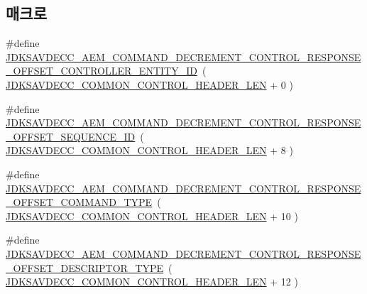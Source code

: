 \subsection*{매크로}
\begin{DoxyCompactItemize}
\item 
\#define \hyperlink{group__command__decrement__control__response_gafbe167331c37f417978a47a423589137}{J\+D\+K\+S\+A\+V\+D\+E\+C\+C\+\_\+\+A\+E\+M\+\_\+\+C\+O\+M\+M\+A\+N\+D\+\_\+\+D\+E\+C\+R\+E\+M\+E\+N\+T\+\_\+\+C\+O\+N\+T\+R\+O\+L\+\_\+\+R\+E\+S\+P\+O\+N\+S\+E\+\_\+\+O\+F\+F\+S\+E\+T\+\_\+\+C\+O\+N\+T\+R\+O\+L\+L\+E\+R\+\_\+\+E\+N\+T\+I\+T\+Y\+\_\+\+ID}~( \hyperlink{group__jdksavdecc__avtp__common__control__header_gaae84052886fb1bb42f3bc5f85b741dff}{J\+D\+K\+S\+A\+V\+D\+E\+C\+C\+\_\+\+C\+O\+M\+M\+O\+N\+\_\+\+C\+O\+N\+T\+R\+O\+L\+\_\+\+H\+E\+A\+D\+E\+R\+\_\+\+L\+EN} + 0 )
\item 
\#define \hyperlink{group__command__decrement__control__response_ga47aac604049ec4cf7d6ffb2fab3abbe1}{J\+D\+K\+S\+A\+V\+D\+E\+C\+C\+\_\+\+A\+E\+M\+\_\+\+C\+O\+M\+M\+A\+N\+D\+\_\+\+D\+E\+C\+R\+E\+M\+E\+N\+T\+\_\+\+C\+O\+N\+T\+R\+O\+L\+\_\+\+R\+E\+S\+P\+O\+N\+S\+E\+\_\+\+O\+F\+F\+S\+E\+T\+\_\+\+S\+E\+Q\+U\+E\+N\+C\+E\+\_\+\+ID}~( \hyperlink{group__jdksavdecc__avtp__common__control__header_gaae84052886fb1bb42f3bc5f85b741dff}{J\+D\+K\+S\+A\+V\+D\+E\+C\+C\+\_\+\+C\+O\+M\+M\+O\+N\+\_\+\+C\+O\+N\+T\+R\+O\+L\+\_\+\+H\+E\+A\+D\+E\+R\+\_\+\+L\+EN} + 8 )
\item 
\#define \hyperlink{group__command__decrement__control__response_gab1c62017f0d870a7d8f5ae3d9e3184e0}{J\+D\+K\+S\+A\+V\+D\+E\+C\+C\+\_\+\+A\+E\+M\+\_\+\+C\+O\+M\+M\+A\+N\+D\+\_\+\+D\+E\+C\+R\+E\+M\+E\+N\+T\+\_\+\+C\+O\+N\+T\+R\+O\+L\+\_\+\+R\+E\+S\+P\+O\+N\+S\+E\+\_\+\+O\+F\+F\+S\+E\+T\+\_\+\+C\+O\+M\+M\+A\+N\+D\+\_\+\+T\+Y\+PE}~( \hyperlink{group__jdksavdecc__avtp__common__control__header_gaae84052886fb1bb42f3bc5f85b741dff}{J\+D\+K\+S\+A\+V\+D\+E\+C\+C\+\_\+\+C\+O\+M\+M\+O\+N\+\_\+\+C\+O\+N\+T\+R\+O\+L\+\_\+\+H\+E\+A\+D\+E\+R\+\_\+\+L\+EN} + 10 )
\item 
\#define \hyperlink{group__command__decrement__control__response_gaf3e4791b7da2318cf80405887a7af8c6}{J\+D\+K\+S\+A\+V\+D\+E\+C\+C\+\_\+\+A\+E\+M\+\_\+\+C\+O\+M\+M\+A\+N\+D\+\_\+\+D\+E\+C\+R\+E\+M\+E\+N\+T\+\_\+\+C\+O\+N\+T\+R\+O\+L\+\_\+\+R\+E\+S\+P\+O\+N\+S\+E\+\_\+\+O\+F\+F\+S\+E\+T\+\_\+\+D\+E\+S\+C\+R\+I\+P\+T\+O\+R\+\_\+\+T\+Y\+PE}~( \hyperlink{group__jdksavdecc__avtp__common__control__header_gaae84052886fb1bb42f3bc5f85b741dff}{J\+D\+K\+S\+A\+V\+D\+E\+C\+C\+\_\+\+C\+O\+M\+M\+O\+N\+\_\+\+C\+O\+N\+T\+R\+O\+L\+\_\+\+H\+E\+A\+D\+E\+R\+\_\+\+L\+EN} + 12 )

\end{DoxyCompactItemize}

